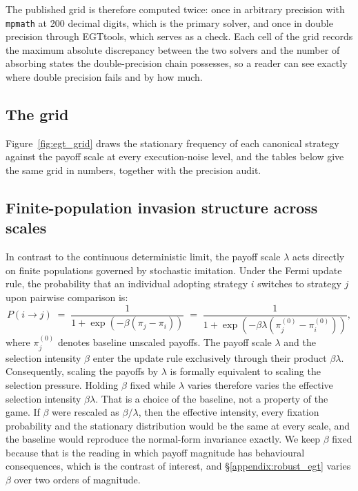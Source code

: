 \documentclass[openacc]{rsproca_new}
\newcommand{\lam}{\lambda}
\newcommand{\rev}[1]{{\color{red}#1}}
\newcommand{\rev}[1]{#1}
\begin{document}
The published grid is therefore computed twice: once in arbitrary precision
with \texttt{mpmath} at 200 decimal digits, which is the primary solver, and
once in double precision through EGTtools, which serves as a check. Each cell
of the grid records the maximum absolute discrepancy between the two solvers
and the number of absorbing states the double-precision chain possesses, so a
reader can see exactly where double precision fails and by how much.

\subsection{The grid}\label{appendix:egt_grid}

Figure~\ref{fig:egt_grid} draws the stationary frequency of each canonical
strategy against the payoff scale at every execution-noise level, and the
tables below give the same grid in numbers, together with the precision audit.

\subsection{Finite-population invasion structure across scales}\label{appendix:egt_invasion}

In contrast to the continuous deterministic limit, the payoff scale $\lam$
acts directly on finite populations governed by stochastic imitation. Under the
Fermi update rule, the probability that an individual adopting strategy $i$
switches to strategy $j$ upon pairwise comparison is:
\begin{equation}
P(i \to j) \;=\; \frac{1}{1 + \exp\left(-\beta (\pi_j - \pi_i)\right)}
\;=\; \frac{1}{1 + \exp\left(-\beta \lam (\pi_j^{(0)} - \pi_i^{(0)})\right)},
\label{eq:fermi_scaling}
\end{equation}
where $\pi_j^{(0)}$ denotes baseline unscaled payoffs. The payoff scale $\lam$
and the selection intensity $\beta$ enter the update rule exclusively through
their product $\beta \lam$. Consequently, scaling the payoffs by $\lam$ is
formally equivalent to scaling the selection pressure. \rev{Holding $\beta$
fixed while $\lam$ varies therefore varies the effective selection intensity
$\beta\lam$. That is a choice of the baseline, not a property of the game. If
$\beta$ were rescaled as $\beta/\lam$, then the effective intensity, every
fixation probability and the stationary distribution would be the same at every scale,
and the baseline would reproduce the normal-form invariance exactly. We keep
$\beta$ fixed because that is the reading in which payoff magnitude has
behavioural consequences, which is the contrast of interest, and
\S\ref{appendix:robust_egt} varies $\beta$ over two orders of magnitude.}
\end{document}
